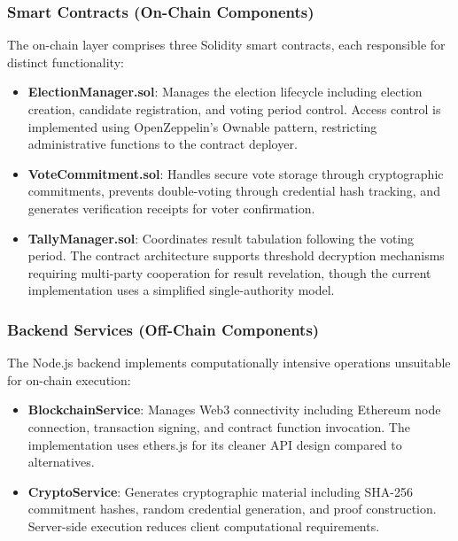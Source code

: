 \documentclass[conference]{IEEEtran}
\begin{document}
\subsubsection{Smart Contracts (On-Chain Components)}
The on-chain layer comprises three Solidity smart contracts, each responsible for distinct functionality:

\begin{itemize}
    \item \textbf{ElectionManager.sol}: Manages the election lifecycle including election creation, candidate registration, and voting period control. Access control is implemented using OpenZeppelin's Ownable pattern, restricting administrative functions to the contract deployer.
    \item \textbf{VoteCommitment.sol}: Handles secure vote storage through cryptographic commitments, prevents double-voting through credential hash tracking, and generates verification receipts for voter confirmation.
    \item \textbf{TallyManager.sol}: Coordinates result tabulation following the voting period. The contract architecture supports threshold decryption mechanisms requiring multi-party cooperation for result revelation, though the current implementation uses a simplified single-authority model.
\end{itemize}

\subsubsection{Backend Services (Off-Chain Components)}
The Node.js backend implements computationally intensive operations unsuitable for on-chain execution:
\begin{itemize}
    \item \textbf{BlockchainService}: Manages Web3 connectivity including Ethereum node connection, transaction signing, and contract function invocation. The implementation uses ethers.js for its cleaner API design compared to alternatives.
    \item \textbf{CryptoService}: Generates cryptographic material including SHA-256 commitment hashes, random credential generation, and proof construction. Server-side execution reduces client computational requirements.
\end{itemize}
\end{document}
